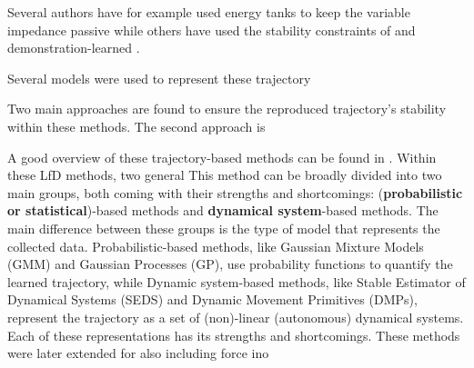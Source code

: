 Several authors have for example used energy tanks to keep the variable impedance passive \cite{amanhoudForceAdaptationContact2020,enayatiVariableImpedanceForceControl2020,kastritsiProgressiveAutomationDMP2018,michelBilateralTeleoperationAdaptive2021,saverianoEnergybasedApproachEnsure2020,shahriariAdaptingContactsEnergy2017,wuFrameworkAutonomousImpedance2021,amanhoudDynamicalSystemApproach2019,kronanderPassiveInteractionControl2016} while others have used the stability constraints of and demonstration-learned \cite{arduengoGaussianProcessbasedRobotLearning2020,douRobotSkillLearning2022}.

Several models were used to represent these trajectory

Two main approaches are found to ensure the reproduced trajectory's stability within these methods.
The second approach is

A good overview of these trajectory-based methods can be found in \cite{siReviewManipulationSkill2021}. Within these LfD methods, two general
This method can be broadly divided into two main groups, both coming with their strengths and shortcomings: (\textbf{probabilistic or statistical})-based methods and \textbf{dynamical system}-based methods. The main difference between these groups is the type of model that represents the collected data. Probabilistic-based methods, like Gaussian Mixture Models (GMM) and Gaussian Processes (GP),
use probability functions to quantify the learned trajectory, while Dynamic system-based methods, like Stable Estimator of Dynamical Systems (SEDS) and Dynamic Movement Primitives (DMPs), represent the trajectory as a set of (non)-linear (autonomous) dynamical systems. Each of these representations has its strengths and shortcomings.
These methods were later extended for also including force ino
